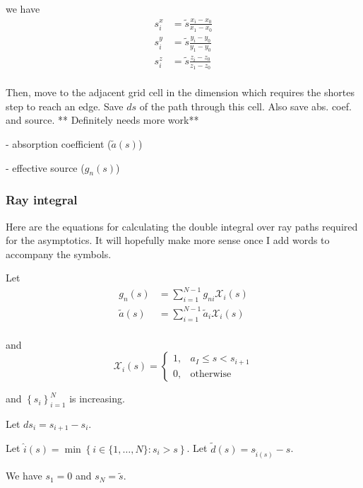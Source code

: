 we have
\begin{align}
  s_i^x &= \tilde{s}\frac{x_i-x_0}{x_1-x_0} \\
  s_i^y &= \tilde{s}\frac{y_i-y_0}{y_1-y_0} \\
  s_i^z &= \tilde{s}\frac{z_i-z_0}{z_1-z_0} \\
\end{align}

Then, move to the adjacent grid cell in the dimension which requires the shortes
step to reach an edge. Save $ds$ of the path through this cell. Also save abs.
coef. and source.
** Definitely needs more work**

- absorption coefficient ($\tilde{a}(s)$)

- effective source ($g_n(s)$)

\subsubsection{Ray integral}

Here are the equations for calculating the double integral over ray paths
required for the asymptotics. It will hopefully make more sense once I add words
to accompany the symbols.

Let
\begin{align}
  g_n(s) &= \sum_{i=1}^{N-1}g_{ni}\mathcal{X}_i(s) \\
  \tilde{a}(s) &= \sum_{i=1}^{N-1}\tilde{a}_{i}\mathcal{X}_i(s) \\
\end{align}

and
\begin{equation}
  \mathcal{X}_i(s) = \begin{cases}
    1, & a_I \leq s < s_{i+1} \\
    0, & \mbox{otherwise}
    \end{cases}
\end{equation}

and $\left\{s_i\right\}_{i=1}^N$ is increasing.

Let $ds_i = s_{i+1} - s_i$.

Let $\hat{i}(s) = \min\left\{ i \in \{1,\ldots,N\} : s_i>s \right\}$.
Let $\tilde{d}(s) = s_{\hat{i}(s)}-s$.

We have $s_1 = 0$ and $s_N = \tilde{s}$.


